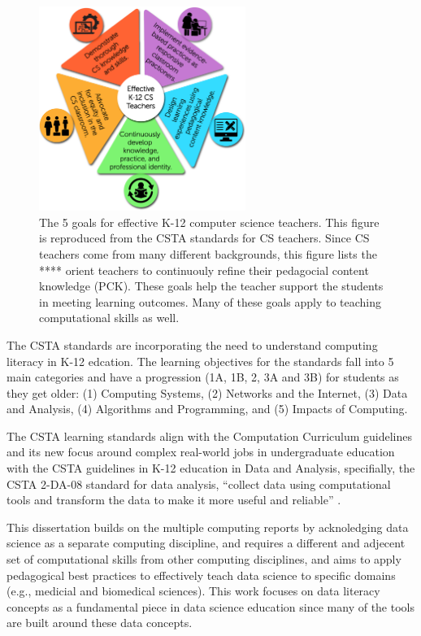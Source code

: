 \documentclass[010-intro.tex]{subfiles}
\begin{document}
    \begin{figure}[htb]
        \centering
        \includegraphics[width=0.6\textwidth]{figs/050-intro/CSTA-Standards-for-CS-Teachers---Main-Graphic.png}
        \caption[CSTA Standards for CS Teachers]{
            The 5 goals for effective K-12 computer science teachers.
            This figure is reproduced from the CSTA standards for CS teachers.
            Since CS teachers come from many different backgrounds,
            this figure lists the **** orient teachers to continuouly refine their pedagocial content knowledge (PCK).
            These goals help the teacher support the students in meeting learning outcomes.
            Many of these goals apply to teaching computational skills as well.
        }
        \label{fig:csta-teaching-standards}
    \end{figure}

    The CSTA standards are incorporating the need to understand computing literacy in K-12 edcation.
    The learning objectives for the standards fall into 5 main categories and have a progression (1A, 1B, 2, 3A and 3B)
    for students as they get older:
    (1) Computing Systems,
    (2) Networks and the Internet,
    (3) Data and Analysis,
    (4) Algorithms and Programming, and
    (5) Impacts of Computing.

    The CSTA learning standards align with the Computation Curriculum guidelines
    and its new focus around complex real-world jobs in undergraduate education with
    the CSTA guidelines in K-12 education in Data and Analysis,
    specifially,
    the CSTA 2-DA-08 standard for data analysis,
    ``collect data using computational tools and transform the data to make it more useful and reliable''
    \cite{csta, csta2017, cc2020}.

    This dissertation builds on the multiple computing reports by acknoledging data science as a separate computing discipline,
    and requires a different and adjecent set of computational skills
    from other computing disciplines,
    and aims to apply pedagogical best practices to effectively teach data science to specific domains (e.g., medicial and biomedical sciences).
    This work focuses on data literacy concepts as a fundamental piece in data science
    education since many of the tools are built around these data concepts.
\end{document}
